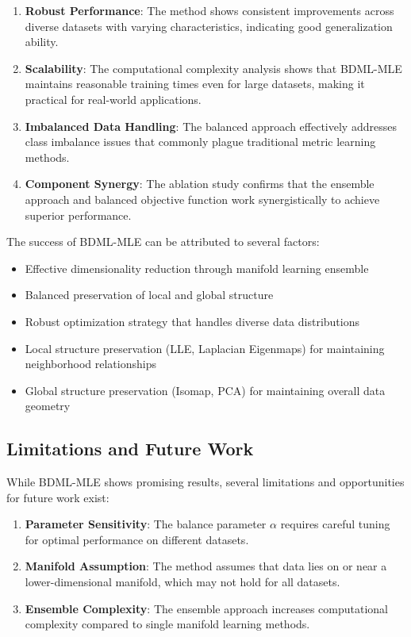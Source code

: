 \documentclass[review]{elsarticle}
\begin{document}
\begin{enumerate}
\item \textbf{Robust Performance}: The method shows consistent improvements across diverse datasets with varying characteristics, indicating good generalization ability.

\item \textbf{Scalability}: The computational complexity analysis shows that BDML-MLE maintains reasonable training times even for large datasets, making it practical for real-world applications.

\item \textbf{Imbalanced Data Handling}: The balanced approach effectively addresses class imbalance issues that commonly plague traditional metric learning methods.

\item \textbf{Component Synergy}: The ablation study confirms that the ensemble approach and balanced objective function work synergistically to achieve superior performance.
\end{enumerate}

The success of BDML-MLE can be attributed to several factors:
\begin{itemize}
\item Effective dimensionality reduction through manifold learning ensemble
\item Balanced preservation of local and global structure
\item Robust optimization strategy that handles diverse data distributions
\item Local structure preservation (LLE, Laplacian Eigenmaps) for maintaining neighborhood relationships
\item Global structure preservation (Isomap, PCA) for maintaining overall data geometry
\end{itemize}

\subsection{Limitations and Future Work}

While BDML-MLE shows promising results, several limitations and opportunities for future work exist:

\begin{enumerate}
\item \textbf{Parameter Sensitivity}: The balance parameter $\alpha$ requires careful tuning for optimal performance on different datasets.

\item \textbf{Manifold Assumption}: The method assumes that data lies on or near a lower-dimensional manifold, which may not hold for all datasets.

\item \textbf{Ensemble Complexity}: The ensemble approach increases computational complexity compared to single manifold learning methods.
\end{enumerate}
\end{document}
